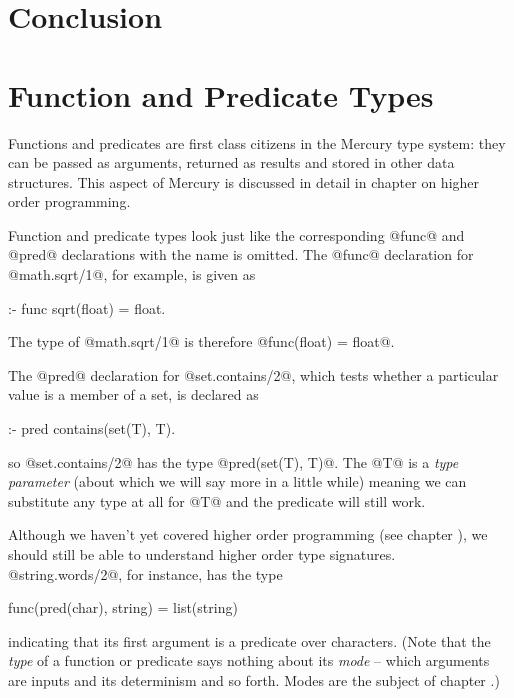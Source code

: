 \section{Conclusion}


\section{Function and Predicate Types}


Functions and predicates are first class citizens in the Mercury type
system: they can be passed as arguments, returned as results
and stored in other data structures.  This aspect of Mercury is
discussed in detail in chapter \XXX{} on higher order programming.

Function and predicate types look just like the corresponding @func@ and
@pred@ declarations with the name is omitted.
The @func@ declaration for @math.sqrt/1@, for example, is given as
\begin{myverbatim}
:- func sqrt(float) = float.
\end{myverbatim}
The type of @math.sqrt/1@ is therefore @func(float) = float@.

The @pred@ declaration for @set.contains/2@, which tests whether a
particular value is a member of a set, is declared as
\begin{myverbatim}
:- pred contains(set(T), T).
\end{myverbatim}
so @set.contains/2@ has the type @pred(set(T), T)@.
The @T@ is a \emph{type parameter} (about which we will say more
in a little while) meaning we can substitute any type at all for @T@ and
the predicate will still work.


Although we haven't yet covered higher order programming (see chapter
\XXX{}), we should still be able to understand higher order type
signatures.  @string.words/2@, for instance, has the type
\begin{myverbatim}
    func(pred(char), string) = list(string)
\end{myverbatim}
indicating that its first argument is a predicate over characters.
(Note that the \emph{type} of a function or predicate says nothing about
its \emph{mode} -- which arguments are inputs and its determinism and so
forth.  Modes are the subject of chapter \XXX{}.)

